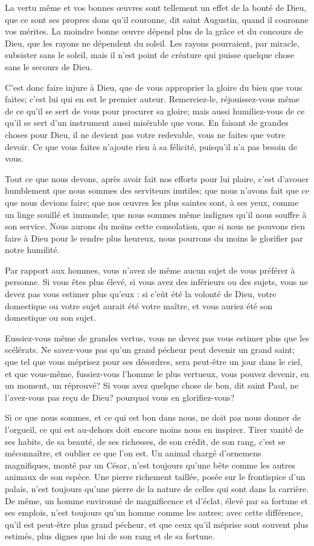 \documentclass[instructions.tex]{subfiles}
\begin{document}
La vertu même et vos bonnes œuvres sont tellement un effet de la bonté de Dieu, que ce sont ses propres dons qu’il couronne, dit saint Augustin, quand il couronne vos mérites. La moindre bonne œuvre dépend plus de la grâce et du concours de Dieu, que les rayons ne dépendent du soleil. Les rayons pourraient, par miracle, subsister sans le soleil, mais il n’est point de créature qui puisse quelque chose sans le secours de Dieu.
 
C’est donc faire injure à Dieu, que de vous approprier la gloire du bien que vous faites; c’est lui qui en est le premier auteur. Remerciez-le, réjouissez-vous même de ce qu’il se sert de vous pour procurer sa gloire; mais aussi humiliez-vous de ce qu’il se sert d’un instrument aussi misérable que vous. En faisant de grandes choses pour Dieu, il ne devient pas votre redevable, vous ne faites que votre devoir. Ce que vous faites n’ajoute rien à sa félicité, puisqu’il n’a pas besoin de vous.
 
Tout ce que nous devons, après avoir fait nos efforts pour lui plaire, c’est d’avouer humblement que nous sommes des serviteurs inutiles; que nous n’avons fait que ce que nous devions faire; que nos œuvres les plus saintes sont, à ses yeux, comme un linge souillé et immonde; que nous sommes même indignes qu’il nous souffre à son service. Nous aurons du moins cette consolation, que si nous ne pouvons rien faire à Dieu pour le rendre plus heureux, nous pourrons du moins le glorifier par notre humilité.
 
Par rapport aux hommes, vous n’avez de même aucun sujet de vous préférer à personne. Si vous êtes plus élevé, si vous avez des inférieurs ou des sujets, vous ne devez pas vous estimer plus qu’eux : si c’eût été la volonté de Dieu, votre domestique ou votre sujet aurait été votre maître, et vous auriez été son domestique ou son sujet.
 
Eussiez-vous même de grandes vertus, vous ne devez pas vous estimer plus que les scélérats. Ne savez-vous pas qu’un grand pécheur peut devenir un grand saint; que tel que vous méprisez pour ses désordres, sera peut-être un jour dans le ciel, et que vous-même, fussiez-vous l’homme le plus vertueux, vous pouvez devenir, en un moment, un réprouvé? Si vous avez quelque chose de bon, dit saint Paul, ne l’avez-vous pas reçu de Dieu? pourquoi vous en glorifiez-vous?
 
Si ce que nous sommes, et ce qui est bon dans nous, ne doit pas nous donner de l’orgueil, ce qui est au-dehors doit encore moins nous en inspirer. Tirer vanité de ses habits, de sa beauté, de ses richesses, de son crédit, de son rang, c’est se méconnaître, et oublier ce que l’on est. Un animal chargé d’ornemens magnifiques, monté par un César, n’est toujours qu’une bête comme les autres animaux de son espèce. Une pierre richement taillée, posée sur le frontispice d’un palais, n’est toujours qu’une pierre de la nature de celles qui sont dans la carrière. De même, un homme environné de magnificence et d’éclat, élevé par sa fortune et ses emplois, n’est toujours qu’un homme comme les autres; avec cette différence, qu’il est peut-être plus grand pécheur, et que ceux qu’il méprise sont souvent plus estimés, plus dignes que lui de son rang et de sa fortune.
 
\end{document}
